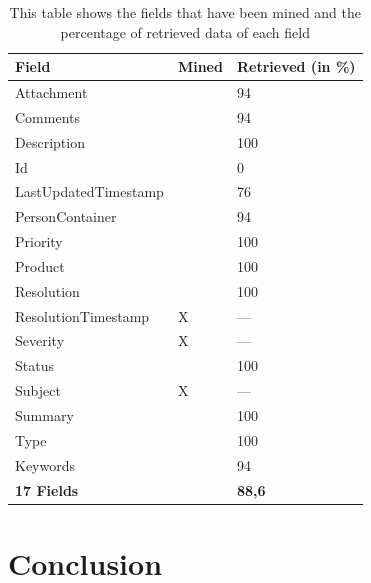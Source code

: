 \begin{table}
\centering
\begin{tabular}{|p{5cm}|p{1.5cm}| p{4.5cm}| }
	\hline
	\textbf{Field} & \textbf{Mined} & \textbf{Retrieved (in \%)} \\
	\hline
	\hline
	Attachment & \centering \checkmark & 94 \\
	\hline
	Comments & \centering \checkmark &  94 \\
	\hline
	Description & \centering \checkmark & 100 \\
	\hline
	Id & \centering \checkmark & 0 \\
	\hline
	LastUpdatedTimestamp & \centering \checkmark & 76 \\
	\hline
	PersonContainer & \centering \checkmark & 94 \\
	\hline
	Priority & \centering \checkmark & 100 \\
	\hline
	Product & \centering \checkmark & 100 \\
	\hline
	Resolution & \centering \checkmark & 100 \\
	\hline
	ResolutionTimestamp & \centering X & --- \\
	\hline
	Severity & \centering X & --- \\
	\hline
	Status & \centering \checkmark & 100 \\
	\hline
	Subject & \centering X & --- \\
	\hline
	Summary & \centering \checkmark & 100 \\
	\hline
	Type & \centering \checkmark & 100 \\
	\hline
	Keywords & \centering \checkmark & 94 \\
	\hline
	\hline
	\textbf{17 Fields} &  & \textbf{88,6} \\
	\hline
\end{tabular}
\caption{This table shows the fields that have been mined and the percentage of retrieved data of each field}
\label{tabelle interface}
\end{table}

\chapter{Conclusion}
\label{Conclusion}

